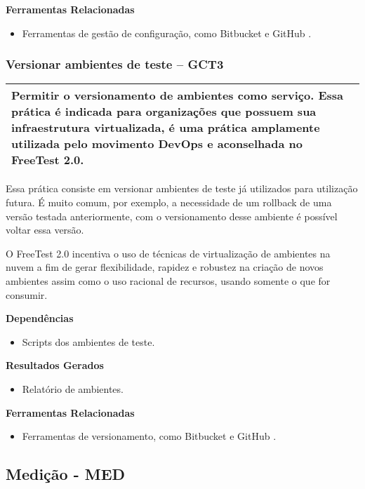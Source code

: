 \textbf{Ferramentas Relacionadas}
\begin{itemize}
    \item Ferramentas de gestão de configuração, como Bitbucket \cite{Bitbucket} e GitHub \cite{GitHub}.
\end{itemize}

\subsubsection{Versionar ambientes de teste – GCT3 }
\label{sec:gct3}

\begin{table}[H]
\centering
\begin{tabular}{|p{130mm}|}
\hline
Permitir o versionamento de ambientes como serviço. Essa prática é indicada para organizações que possuem sua infraestrutura virtualizada, é uma prática amplamente utilizada pelo movimento DevOps e aconselhada no FreeTest 2.0. \\ 
\hline
\end{tabular}
\end{table}

Essa prática consiste em versionar ambientes de teste já utilizados para utilização futura. É muito comum, por exemplo, a necessidade de um rollback de uma versão testada anteriormente, com o versionamento desse ambiente é possível voltar essa versão.

O FreeTest 2.0 incentiva o uso de técnicas de virtualização de ambientes na nuvem a fim de gerar flexibilidade, rapidez e robustez na criação de novos ambientes assim como o uso racional de recursos, usando somente o que for consumir.

\textbf{Dependências}
 \begin{itemize}
     \item Scripts dos ambientes de teste.
\end{itemize}

\textbf{Resultados Gerados }
\begin{itemize}
    \item Relatório de ambientes.
\end{itemize}

\textbf{Ferramentas Relacionadas }
\begin{itemize}
    \item Ferramentas de versionamento, como Bitbucket \cite{Bitbucket} e GitHub \cite{GitHub}.
\end{itemize}

\subsection{Medição - MED}
\label{sec:med}

